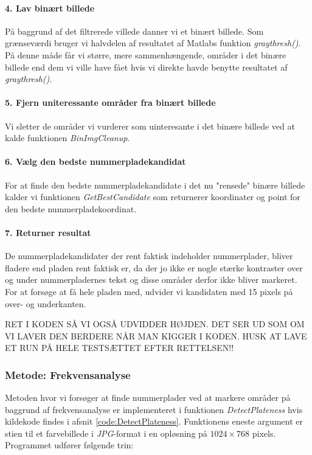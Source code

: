 \paragraph{4. Lav binært billede}
På baggrund af det filtrerede villede danner vi et binært billede. Som grænseværdi bruger vi halvdelen af resultatet af Matlabs funktion \textit{graythresh()}. På denne måde får vi større, mere sammenhængende, områder i det binære billede end dem vi ville have fået hvis vi direkte havde benytte resultatet af \textit{graythresh()}.

\paragraph{5. Fjern uniteressante områder fra binært billede}
Vi sletter de områder vi vurderer som uinteresante i det binære billede ved at kalde funktionen \textit{BinImgCleanup}.

\paragraph{6. Vælg den bedste nummerpladekandidat}
For at finde den bedste nummerpladekandidate i det nu "rensede" binære billede kalder vi funktionen \textit{GetBestCandidate} som returnerer koordinater og point for den bedste nummerpladekoordinat.

\paragraph{7. Returner resultat}
De nummerpladekandidater der rent faktisk indeholder nummerplader, bliver fladere end pladen rent faktisk er, da der jo ikke er nogle stærke kontraster over og under nummerpladernes tekst og disse områder derfor ikke bliver markeret. For at forsøge at få hele pladen med, udvider vi kandidaten med 15 pixels på over- og underkanten. 

RET I KODEN SÅ VI OGSÅ UDVIDDER HØJDEN. DET SER UD SOM OM VI LAVER DEN BERDERE NÅR MAN KIGGER I KODEN. HUSK AT LAVE ET RUN PÅ HELE TESTSÆTTET EFTER RETTELSEN!!

\subsubsection{Metode: Frekvensanalyse}
Metoden hvor vi forsøger at finde nummerplader ved at markere områder på baggrund af frekvensanalyse er implementeret i funktionen \textit{DetectPlateness} hvis kildekode findes i afsnit \vref{code:DetectPlateness}. Funktionens eneste argument er stien til et farvebillede i \textit{JPG}-format i en opløsning på $1024 \times 768$ pixels. Programmet udfører følgende trin:

